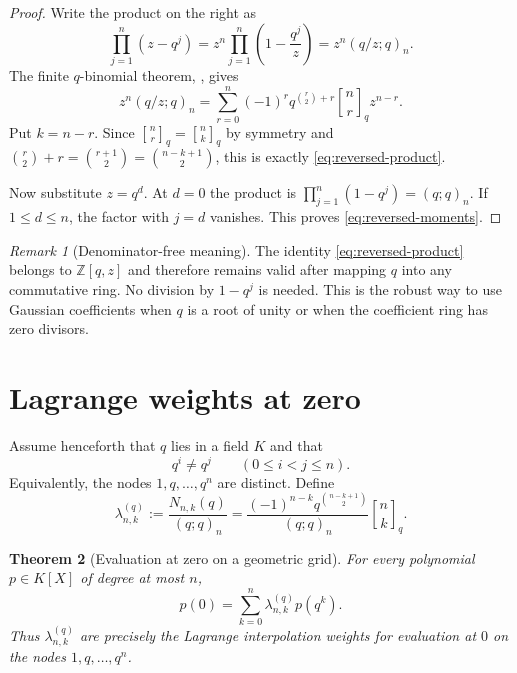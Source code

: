\documentclass[11pt,oneside,openany]{book}
\newtheorem{theorem}{Theorem}[chapter]
\theoremstyle{definition}
\theoremstyle{remark}
\newtheorem{remark}[theorem]{Remark}
\newcommand{\qbinom}[2]{\genfrac{[}{]}{0pt}{}{#1}{#2}_{q}}
\newcommand{\Z}{\mathbb Z}
\begin{document}
\begin{proof}
Write the product on the right as
\[
 \prod_{j=1}^{n}(z-q^j)
 =z^n\prod_{j=1}^{n}\left(1-\frac{q^j}{z}\right)
 =z^n(q/z;q)_n.
\]
The finite $q$-binomial theorem, , gives
\[
 z^n(q/z;q)_n
 =\sum_{r=0}^{n}(-1)^r q^{\binom r2+r}\qbinom nr z^{n-r}.
\]
Put $k=n-r$.  Since $\qbinom nr=\qbinom nk$ by symmetry and
$\binom r2+r=\binom{r+1}{2}=\binom{n-k+1}{2}$, this is exactly
\eqref{eq:reversed-product}.

Now substitute $z=q^d$.  At $d=0$ the product is
$\prod_{j=1}^{n}(1-q^j)=(q;q)_n$.  If $1\le d\le n$, the factor with
$j=d$ vanishes.  This proves \eqref{eq:reversed-moments}.
\end{proof}

\begin{remark}[Denominator-free meaning]\label{rem:denominator-free-reversed}
The identity \eqref{eq:reversed-product} belongs to $\Z[q,z]$ and therefore remains valid after mapping $q$ into any commutative ring.  No division by $1-q^j$ is needed.  This is the robust way to use Gaussian coefficients when $q$ is a root of unity or when the coefficient ring has zero divisors.
\end{remark}

\section{Lagrange weights at zero}

Assume henceforth that $q$ lies in a field $K$ and that
\[
 q^i\ne q^j\qquad(0\le i<j\le n).
\]
Equivalently, the nodes $1,q,\ldots,q^n$ are distinct.  Define
\begin{equation}\label{eq:geometric-lagrange-weight}
 \lambda_{n,k}^{(q)}
 :=\frac{N_{n,k}(q)}{(q;q)_n}
 =\frac{(-1)^{n-k}q^{\binom{n-k+1}{2}}}{(q;q)_n}\qbinom nk.
\end{equation}

\begin{theorem}[Evaluation at zero on a geometric grid]\label{thm:geometric-evaluation-zero}
For every polynomial $p\in K[X]$ of degree at most $n$,
\begin{equation}\label{eq:geometric-eval-zero}
 p(0)=\sum_{k=0}^{n}\lambda_{n,k}^{(q)}p(q^k).
\end{equation}
Thus $\lambda_{n,k}^{(q)}$ are precisely the Lagrange interpolation weights for evaluation at $0$ on the nodes $1,q,\ldots,q^n$.
\end{theorem}
\end{document}
